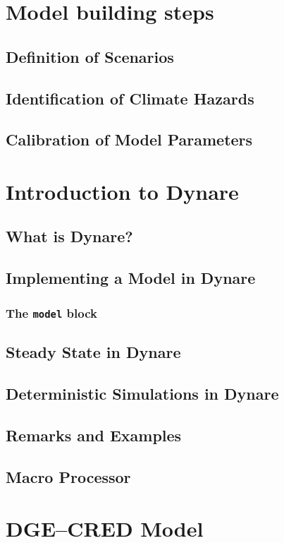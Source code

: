 \documentclass[11pt,aspectratio=169]{beamer}
\begin{document}
\section{Model building steps}

\subsection{Definition of Scenarios}

\subsection{Identification of Climate Hazards}
\subsection{Calibration of Model Parameters}
\section{Introduction to Dynare}

\subsection{What is Dynare?}

\subsection{Implementing a Model in Dynare}
\subsubsection{The \texttt{model} block}
\subsection{Steady State in Dynare}
\subsection{Deterministic Simulations in Dynare}
\subsection{Remarks and Examples}
\subsection{Macro Processor}
\section{DGE--CRED Model}
\end{document}
